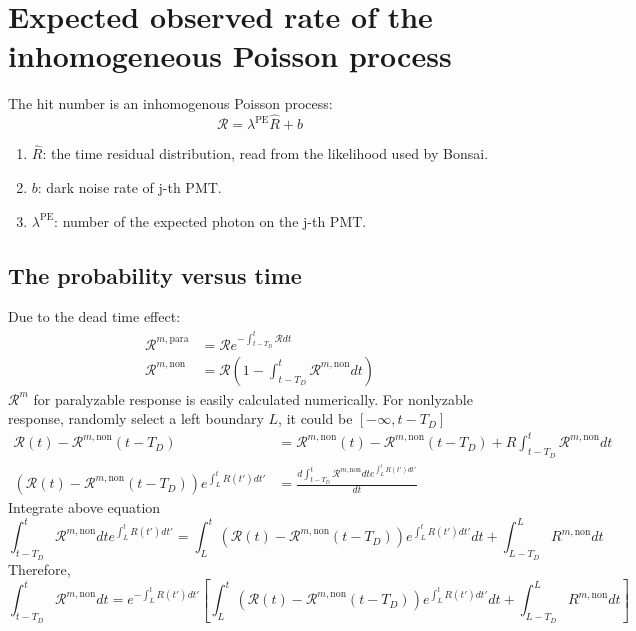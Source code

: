 \section{Expected observed rate of the inhomogeneous Poisson process}
The hit number is an inhomogenous Poisson process:
	\[\mathcal{R}=\lambda^\mathrm{PE}\hat{R}+b\]
	\begin{enumerate}
	\item $\hat{R}$: the time residual distribution, read from the likelihood used by Bonsai.
	\item $b$: dark noise rate of j-th PMT.
	\item $\lambda^\mathrm{PE}$: number of the expected photon on the j-th PMT.
	\end{enumerate}
\subsection{The probability versus time}
Due to the dead time effect:
\begin{equation}
\begin{aligned}
\mathcal{R}^{m,\mathrm{para}}&=\mathcal{R}e^{-\int_{t-T_D}^t{\mathcal{R}dt}}\\
\mathcal{R}^{m,\mathrm{non}}&=\mathcal{R}(1-\int_{t-T_D}^t{\mathcal{R}^{m,\mathrm{non}}dt})
\end{aligned}
\end{equation}
$\mathcal{R}^m$ for paralyzable response is easily calculated numerically. For nonlyzable response, randomly select a left boundary $L$, it could be $[-\infty,t-T_D]$
\begin{equation}
\begin{aligned}
\mathcal{R}(t)-\mathcal{R}^{m,\mathrm{non}}(t-T_D)&=\mathcal{R}^{m,\mathrm{non}}(t)-\mathcal{R}^{m,\mathrm{non}}(t-T_D)+R\int_{t-T_D}^t{\mathcal{R}^{m,\mathrm{non}}dt}\\
(\mathcal{R}(t)-\mathcal{R}^{m,\mathrm{non}}(t-T_D))e^{\int_{L}^{t}{R(t')dt'}}&=\frac{d\int_{t-T_D}^t{\mathcal{R}^{m,\mathrm{non}}dt}e^{\int_{L}^{t}{R(t')dt'}}}{dt}
\end{aligned}
\end{equation}
Integrate above equation
\begin{equation}
\int_{t-T_D}^t{\mathcal{R}^{m,\mathrm{non}}dt}e^{\int_{L}^{t}{R(t')dt'}}=\int_{L}^{t}{(\mathcal{R}(t)-\mathcal{R}^{m,\mathrm{non}}(t-T_D))e^{\int_{L}^{t}{R(t')dt'}}dt} + \int_{L-T_D}^{L}{R^{m,\mathrm{non}}dt}
\end{equation}
Therefore, 
\begin{equation}
\int_{t-T_D}^t{\mathcal{R}^{m,\mathrm{non}}dt}=e^{-\int_{L}^{t}{R(t')dt'}}\left[\int_{L}^{t}{(\mathcal{R}(t)-\mathcal{R}^{m,\mathrm{non}}(t-T_D))e^{\int_{L}^{t}{R(t')dt'}}dt} + \int_{L-T_D}^{L}{R^{m,\mathrm{non}}dt}\right]
\label{equ:nonpara_integration}
\end{equation}
